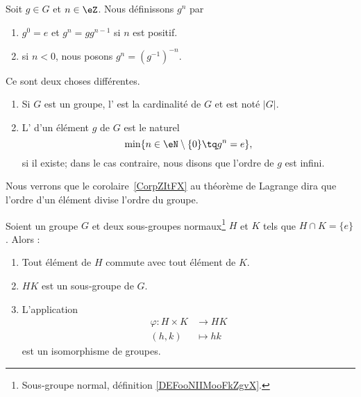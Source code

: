 \begin{definition}
    Soit \( g\in G\) et \( n\in \eZ\). Nous définissons \( g^n\) par
    \begin{enumerate}
        \item
            \( g^0=e\) et \( g^n=gg^{n-1}\) si \( n\) est positif.
        \item
            si \( n<0\), nous posons \( g^n=(g^{-1})^{-n}\).
    \end{enumerate}
\end{definition}

\begin{definition}       \label{DEFooKWBCooMlmpCP}
    Ce sont deux choses différentes.
    \begin{enumerate}
        \item

    Si \( G\) est un groupe, l' est la cardinalité de \( G\) et est noté \( | G |\).
\item

    L' d'un élément \( g\) de \( G\) est le naturel
    \begin{equation}
        \min\{ n\in\eN\setminus\{ 0 \}\tq g^n=e \},
    \end{equation}
    si il existe; dans le cas contraire, nous disons que l'ordre de \( g\) est infini.
    \end{enumerate}
\end{definition}
Nous verrons que le corolaire~\ref{CorpZItFX} au théorème de Lagrange dira que l'ordre d'un élément divise l'ordre du groupe.

\begin{lemma}\label{LemHUkMxp}
    Soient un groupe \( G\) et deux sous-groupes normaux\footnote{Sous-groupe normal, définition \ref{DEFooNIIMooFkZgvX}.} \( H\) et \( K\) tels que \( H\cap K=\{ e \}\). Alors :
    \begin{enumerate}
        \item       \label{ITEMooDFVBooSnnlgR}
            Tout élément de \( H\) commute avec tout élément de \( K\).
        \item       \label{ITEMooVVBGooZSJqjp}
            \( HK\) est un sous-groupe de \( G\).
        \item       \label{IMTEooPCBZooQoZFOD}
            L'application
            \begin{equation}
                \begin{aligned}
                    \varphi\colon H\times K&\to HK \\
                    (h,k)&\mapsto hk 
                \end{aligned}
            \end{equation}
            est un isomorphisme de groupes.
    \end{enumerate}
\end{lemma}

